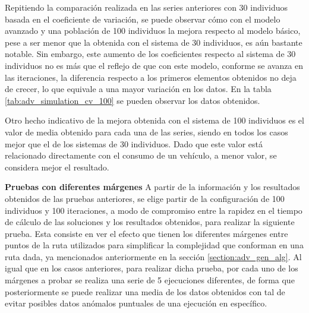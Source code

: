 \documentclass[11pt,spanish,listoffigures,listoftables]{tfgetsinf}
\begin{document}
Repitiendo la comparación realizada en las series anteriores con 30 individuos basada en el coeficiente de variación, se puede observar cómo con el modelo avanzado y una población de 100 individuos la mejora respecto al modelo básico, pese a ser menor que la obtenida con el sistema de 30 individuos, es aún bastante notable. Sin embargo, este aumento de los coeficientes respecto al sistema de 30 individuos no es más que el reflejo de que con este modelo, conforme se avanza en las iteraciones, la diferencia respecto a los primeros elementos obtenidos no deja de crecer, lo que equivale a una mayor variación en los datos. En la tabla \ref{tab:adv_simulation_cv_100} se pueden observar los datos obtenidos.

Otro hecho indicativo de la mejora obtenida con el sistema de 100 individuos es el valor de media obtenido para cada una de las series, siendo en todos los casos mejor que el de los sistemas de 30 individuos. Dado que este valor está relacionado directamente con el consumo de un vehículo, a menor valor, se considera mejor el resultado.

\newpage 
\textbf{Pruebas con diferentes márgenes}\newline
A partir de la información y los resultados obtenidos de las pruebas anteriores, se elige partir de la configuración de 100 individuos y 100 iteraciones, a modo de compromiso entre la rapidez en el tiempo de cálculo de las soluciones y los resultados obtenidos, para realizar la siguiente prueba. Esta consiste en ver el efecto que tienen los diferentes márgenes entre puntos de la ruta utilizados para simplificar la complejidad que conforman en una ruta dada, ya mencionados anteriormente en la sección \ref{section:adv_gen_alg}. Al igual que en los casos anteriores, para realizar dicha prueba, por cada uno de los márgenes a probar se realiza una serie de 5 ejecuciones diferentes, de forma que posteriormente se puede realizar una media de los datos obtenidos con tal de evitar posibles datos anómalos puntuales de una ejecución en específico.
\end{document}
